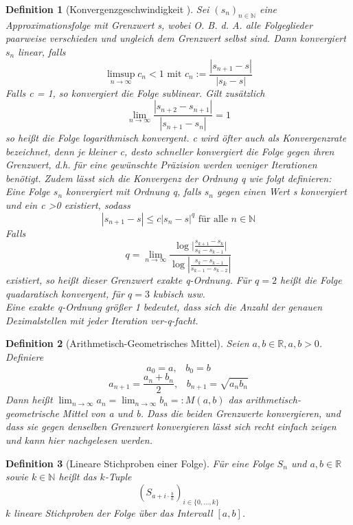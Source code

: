 \documentclass{scrartcl}
\newtheorem{definition}{Definition}
\theoremstyle{definition}
\newtheorem{approximation sequence}{Annäherungsfolge}
\begin{document}
\begin{definition}[Konvergenzgeschwindigkeit \cite{Konvergenzgeschwindigkeit}]
    Sei \((s_n)_{n \in \mathbb{N}}\) eine Approximationsfolge mit Grenzwert s, wobei O. B. d. A. alle Folgeglieder paarweise verschieden und ungleich dem Grenzwert selbst sind.
    Dann konvergiert \(s_n\) linear, falls
    \[\limsup_{n \to \infty} c_n < 1 \text{ mit } c_n := \frac{|s_{n+1}-s|}{|s_k-s|} \]
    Falls c = 1, so konvergiert die Folge sublinear.
    Gilt zusätzlich 
    \[\lim_{n \to \infty} \frac{|s_{n+2}-s_{n+1}|}{|s_{n+1}-s_n|} = 1\]
    so heißt die Folge logarithmisch konvergent.
    c wird öfter auch als Konvergenzrate bezeichnet, denn je kleiner c, desto schneller konvergiert die Folge gegen ihren Grenzwert, 
    d.h. für eine gewünschte Präzision werden weniger Iterationen benötigt.
    Zudem lässt sich die Konvergenz der Ordnung q wie folgt definieren:
    Eine Folge \(s_n\) konvergiert mit Ordnung q, falls \(s_n\) gegen einen Wert s konvergiert und ein c \textgreater 0 existiert, sodass
    \[|s_{n+1} - s| \leqslant c|s_n - s|^q \text{ für alle } n \in \mathbb{N}\]
    Falls
    \[q = \lim_{n \to \infty} \frac{\log|{\frac{s_{k+1} - s_k}{s_k - s_{k-1}}|}}{\log{|\frac{s_k - s_{k-1}}{s_{k-1} - s_{k-2}}|}} \]
    existiert, so heißt dieser Grenzwert exakte q-Ordnung.
    Für \(q = 2\) heißt die Folge quadaratisch konvergent, für \(q = 3 \) kubisch usw. \\
    Eine exakte q-Ordnung größer 1 bedeutet, dass sich die Anzahl der genauen Dezimalstellen mit jeder Iteration ver-q-facht.
\end{definition}

\begin{definition}[Arithmetisch-Geometrisches Mittel]
    Seien \(a, b \in \mathbb{R}, a,b > 0\). Definiere 
    \[a_0 = a, \;\;\; b_0 = b\]
    \[a_{n+1} = \frac{a_n + b_n}{2}, \;\;\; b_{n+1} = \sqrt{a_n b_n}\]
    Dann heißt \(\lim_{n \to \infty}a_n = \lim_{n \to \infty} b_n =: M(a,b) \) das arithmetisch-geometrische Mittel von a und b.
    Dass die beiden Grenzwerte konvergieren, und dass sie gegen denselben Grenzwert konvergieren lässt sich recht einfach zeigen und kann 
    hier \cite{AGM} nachgelesen werden.
\end{definition}

\begin{definition}[Lineare Stichproben einer Folge]
    Für eine Folge \(S_n\) und \(a, b \in \mathbb{R}\) sowie \(k \in
    \mathbb{N}\) heißt das \(k\)-Tuple
    \begin{equation}
        \left(S_{a + i \cdot \frac{b}{k}}\right)_{i \in \{0, \ldots, k\}}
    \end{equation}
    \(k\) lineare Stichproben der Folge über das Intervall \([a, b]\).
\end{definition}
\end{document}
